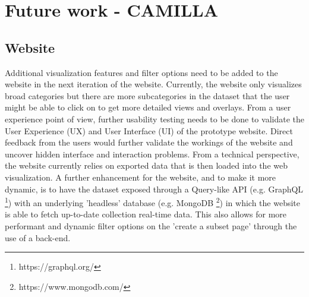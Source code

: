 \section{Future work - CAMILLA}

\subsection{Website}

Additional visualization features and filter options need to be added to the website in the next iteration of the website. Currently, the website only visualizes broad categories but there are more subcategories in the dataset that the user might be able to click on to get more detailed views and overlays. From a user experience point of view, further usability testing needs to be done to validate the User Experience (UX) and User Interface (UI) of the prototype website. Direct feedback from the users would further validate the workings of the website and uncover hidden interface and interaction problems. From a technical perspective, the website currently relies on exported data that is then loaded into the web visualization. A further enhancement for the website, and to make it more dynamic, is to have the dataset exposed through a Query-like API (e.g. GraphQL \footnote{https://graphql.org/}) with an underlying 'headless' database (e.g. MongoDB \footnote{https://www.mongodb.com/}) in which the website is able to fetch up-to-date collection real-time data. This also allows for more performant and dynamic filter options on the 'create a subset page' through the use of a back-end.

